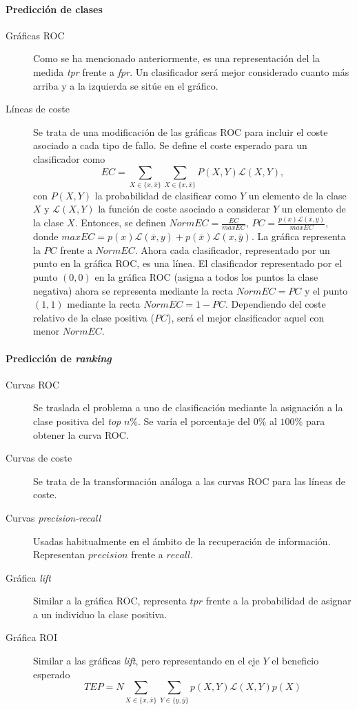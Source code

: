 \paragraph{Predicción de clases}
	\begin{description}
		\item[Gráficas ROC] Como se ha mencionado 
		anteriormente, es una representación del la medida 
		\textit{tpr} frente a \textit{fpr}. Un clasificador 
		será mejor considerado cuanto más arriba y a la 
		izquierda se sitúe en el gráfico. 
		\item[Líneas de coste] Se trata de una modificación 
		de las gráficas ROC para incluir el coste asociado a 
		cada tipo de fallo. Se define el coste esperado para 
		un clasificador como 
		\[ EC = \sum\limits_{X \in \{x, \bar{x}\}} 
		 		\sum\limits_{X \in \{x, \bar{x}\}} 
		 			P(X,Y) \mathcal{L}(X,Y),
		 \]
con $P(X,Y)$ la probabilidad de clasificar como $Y$ un
elemento de la clase $X$ y $\mathcal{L}(X,Y)$ la
función de coste asociado a considerar $Y$ un elemento
de la clase $X$.
Entonces, se definen $NormEC = \frac{EC}{maxEC}$, $PC = 
\frac{p(x) \mathcal{L}(\bar{x},y)}{maxEC}$, donde $maxEC 
= p(x)\mathcal{L}(\bar{x},y)+p(\bar{x})\mathcal{L}(x,
\bar{y})$.  La gráfica representa la $PC$ frente a 
$NormEC$. Ahora cada clasificador, representado por un 
punto en la gráfica ROC, es una línea. El clasificador 
representado por el punto $(0,0)$ en la gráfica ROC (asigna a 
todos los puntos la clase negativa) ahora se representa 
mediante la recta $NormEC=PC$ y el punto $(1,1)$ mediante la 
recta $NormEC= 1-PC$. Dependiendo del coste relativo de la 
clase positiva ($PC$), será el mejor clasificador aquel con 
menor $NormEC$.
	\end{description}

\paragraph{Predicción de \textit{ranking}} 	
	\begin{description}
		\item[Curvas ROC] Se traslada el problema a uno de 
		clasificación mediante la asignación a la clase 
		positiva del \textit{top} $n\%$. Se varía el 
		porcentaje del $0\%$ al $100\%$ para obtener la curva 
		ROC.
		\item[Curvas de coste] Se trata de la transformación 
		análoga a las curvas ROC para las líneas de coste.
		\item[Curvas \textit{precision-recall}] Usadas 
		habitualmente en el ámbito de la recuperación de 
		información. Representan $precision$ frente a 
		$recall$.
		\item[Gráfica \textit{lift}] Similar a la gráfica 
		ROC, representa $tpr$ frente a la probabilidad de 
		asignar a un individuo la clase positiva. 
		\item[Gráfica ROI] Similar a las gráficas 
		\textit{lift}, pero representando en el eje $Y$ el 
		beneficio esperado 
		\[	TEP = N \sum\limits_{X \in \{x,\bar{x}\}}
					\sum\limits_{Y \in \{y,\bar{y}\}}
						p(X,Y) \mathcal{L}(X,Y) p(X) \]
	\end{description}


